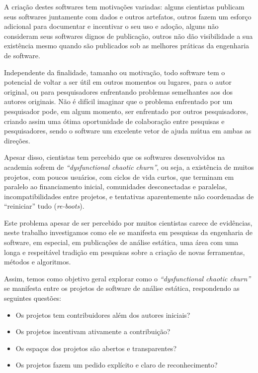A criação destes softwares tem motivações variadas:  alguns cientistas publicam
seus softwares juntamente com dados e outros artefatos, outros fazem um esforço
adicional para documentar e incentivar o seu uso e adoção, alguns não
consideram seus softwares dignos de publicação, outros não dão visibilidade a
sua existência mesmo quando são publicados sob as melhores práticas da
engenharia de software.

Independente da finalidade, tamanho ou motivação, todo software tem o potencial
de voltar a ser útil em outros momentos ou lugares, para o autor original,
ou para pesquisadores enfrentando problemas semelhantes aos dos autores originais.
Não é difícil imaginar que o problema enfrentado por um pesquisador pode, em
algum momento, ser enfrentado por outros pesquisadores, criando assim uma ótima
oportunidade de colaboração entre pesquisas e pesquisadores, sendo o software
um excelente vetor de ajuda mútua em ambas as direções.

Apesar disso, cientistas tem percebido que os softwares desenvolvidos na
academia sofrem de {\it ``dysfunctional chaotic churn''}, ou seja, a existência
de muitos projetos, com poucos usuários, com ciclos de vida curtos, que
terminam em paralelo ao financiamento inicial, comunidades desconectadas e
paralelas, incompatibilidades entre projetos, e tentativas aparentemente não
coordenadas de ``reiniciar'' tudo ({\it re-boots}).


Este problema apesar de ser percebido por muitos cientistas carece de
evidências, neste trabalho investigamos como ele se manifesta em pesquisas da
engenharia de software, em especial, em publicações de análise estática, uma
área com uma longa e respeitável tradição em pesquisas sobre a criação de novas
ferramentas, métodos e algoritmos.

Assim, temos como objetivo geral explorar como o {\it ``dysfunctional chaotic
churn''} se manifesta entre os projetos de software de análise estática,
respondendo as seguintes questões:

\begin{itemize}
  \item Os projetos tem contribuidores além dos autores iniciais?
  \item Os projetos incentivam ativamente a contribuição?
  \item Os espaços dos projetos são abertos e transparentes?
  \item Os projetos fazem um pedido explícito e claro de reconhecimento?
\end{itemize}

